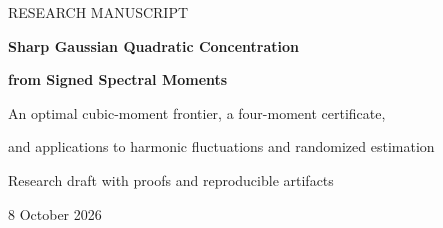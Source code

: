 \documentclass[11pt,letterpaper]{article}
\numberwithin{equation}{section}
\theoremstyle{definition}\newtheorem{definition}[theorem]{Definition}
\theoremstyle{remark}\newtheorem{remark}[theorem]{Remark}
\newcommand{\PP}{\mathbb P}
\newcommand{\tr}{\operatorname{tr}}
\newcommand{\op}{\mathrm{op}}
\begin{document}
\begin{titlepage}
\vspace*{0.6in}
{\color{accent}\sffamily\large RESEARCH MANUSCRIPT\par}
\vspace{0.3in}
{\color{ink}\LARGE\bfseries Sharp Gaussian Quadratic Concentration\par}
\vspace{0.08in}
{\color{ink}\LARGE\bfseries from Signed Spectral Moments\par}
\vspace{0.24in}
{\large An optimal cubic-moment frontier, a four-moment certificate,\par
and applications to harmonic fluctuations and randomized estimation\par}
\vspace{0.4in}
{\large Research draft with proofs and reproducible artifacts\par}
\vspace{0.08in}
{8 October 2026\par}
\vspace{0.35in}
\begin{abstract}
Let $Q=g^{\mathsf T}Ag-\tr A$ for a standard real Gaussian vector and a
nonzero symmetric matrix. Set $L=\|A\|_{\op}$, $v=\tr A^2$, and
$s=\tr A^3/(Lv)$. We determine the largest constant $c(s)$ for which
$\PP(Q\ge t)\le\exp[-c(s)\min\{t^2/v,t/L\}]$ holds in every dimension
at the specified value of $s$. The answer is explicit: it is the minimum
of $1/4$ and a closed-form signed-Gamma rate at normalized deviation one.
There is a transition at $s=-0.705589538603\ldots$. In particular,
$c(0)=0.188714038110\ldots$, compared with the established unrestricted
constant $(1-\log2)/2=0.153426409720\ldots$.


\end{abstract}
\end{titlepage}
\end{document}
